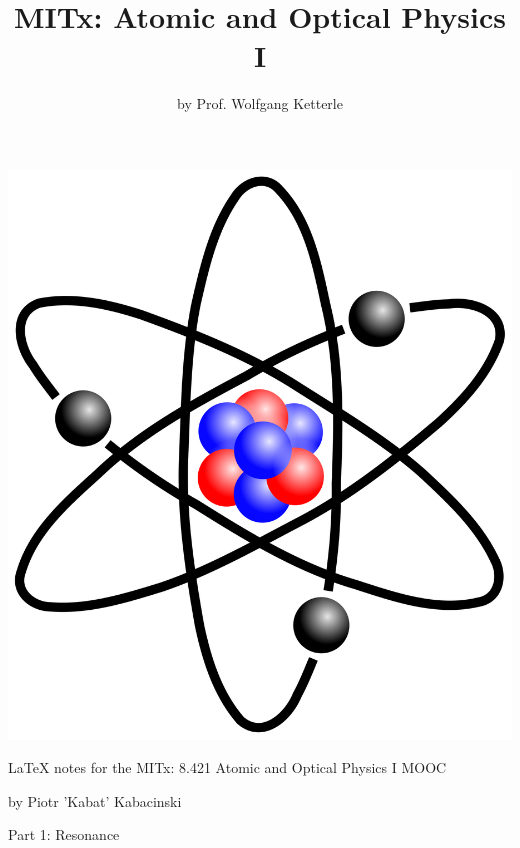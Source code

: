 
\title{\Huge MITx: Atomic and Optical Physics I}
\author{by Prof. Wolfgang Ketterle}
\date{}



\maketitle

\includegraphics[width=\linewidth]{title}

\begin{center}\LaTeX \hspace{0.5 mm} notes for the MITx: 8.421 Atomic and Optical Physics I MOOC\end{center}
\begin{center}by Piotr 'Kabat' Kabacinski\end{center}

\newpage

\begin{center}\Huge Part 1: Resonance\end{center}



\newpage



\newpage



\newpage

